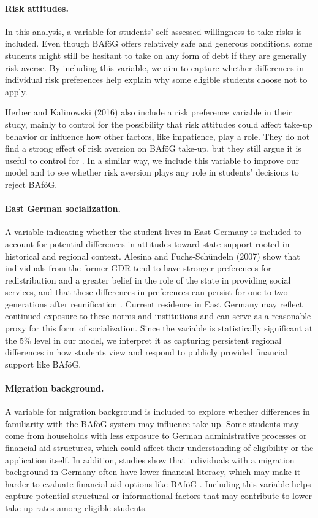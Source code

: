 \paragraph{Risk attitudes.} In this analysis, a variable for students' self-assessed willingness to take risks is included. Even though BAföG offers relatively safe and generous conditions, some students might still be hesitant to take on any form of debt if they are generally risk-averse. By including this variable, we aim to capture whether differences in individual risk preferences help explain why some eligible students choose not to apply.

Herber and Kalinowski (2016) also include a risk preference variable in their study, mainly to control for the possibility that risk attitudes could affect take-up behavior or influence how other factors, like impatience, play a role. They do not find a strong effect of risk aversion on BAföG take-up, but they still argue it is useful to control for \citep{herber_non-take-up_2019}. In a similar way, we include this variable to improve our model and to see whether risk aversion plays any role in students’ decisions to reject BAföG.

\paragraph{East German socialization.}  A variable indicating whether the student lives in East Germany is included to account for potential differences in attitudes toward state support rooted in historical and regional context. Alesina and Fuchs-Schündeln (2007) show that individuals from the former GDR tend to have stronger preferences for redistribution and a greater belief in the role of the state in providing social services, and that these differences in preferences can persist for one to two generations after reunification \citep{alesina_good-bye_2007}. Current residence in East Germany may reflect continued exposure to these norms and institutions and can serve as a reasonable proxy for this form of socialization. Since the variable is statistically significant at the 5\% level in our model, we interpret it as capturing persistent regional differences in how students view and respond to publicly provided financial support like BAföG.

\paragraph{Migration background.} A variable for migration background is included to explore whether differences in familiarity with the BAföG system may influence take-up. Some students may come from households with less exposure to German administrative processes or financial aid structures, which could affect their understanding of eligibility or the application itself. In addition, studies show that individuals with a migration background in Germany often have lower financial literacy, which may make it harder to evaluate financial aid options like BAföG \citep{Tsegay_2024}. Including this variable helps capture potential structural or informational factors that may contribute to lower take-up rates among eligible students. 

